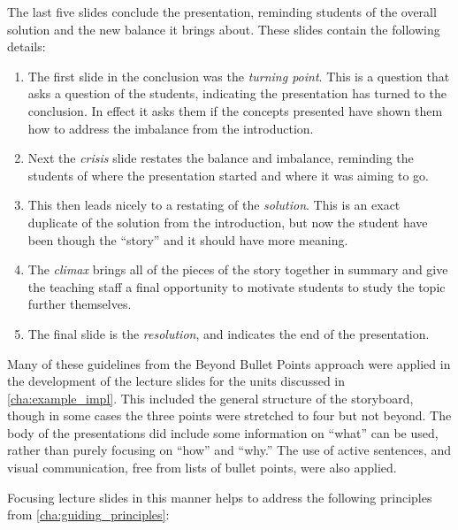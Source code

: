 The last five slides conclude the presentation, reminding students of the overall solution and the new balance it brings about. These slides contain the following details:
\begin{enumerate}
	\item The first slide in the conclusion was the \emph{turning point}. This is a question that asks a question of the students, indicating the presentation has turned to the conclusion. In effect it asks them if the concepts presented have shown them how to address the imbalance from the introduction.
	\item Next the \emph{crisis} slide restates the balance and imbalance, reminding the students of where the presentation started and where it was aiming to go.
	\item This then leads nicely to a restating of the \emph{solution}. This is an exact duplicate of the solution from the introduction, but now the student have been though the ``story'' and it should have more meaning.
	\item The \emph{climax} brings all of the pieces of the story together in summary and give the teaching staff a final opportunity to motivate students to study the topic further themselves.
	\item The final slide is the \emph{resolution}, and indicates the end of the presentation.
\end{enumerate}

Many of these guidelines from the Beyond Bullet Points approach were applied in the development of the lecture slides for the units discussed in \cref{cha:example_impl}. This included the general structure of the storyboard, though in some cases the three points were stretched to four but not beyond. The body of the presentations did include some information on ``what'' can be used, rather than purely focusing on ``how'' and ``why.'' The use of active sentences, and visual communication, free from lists of bullet points, were also applied.

Focusing lecture slides in this manner helps to address the following principles from \cref{cha:guiding_principles}:

